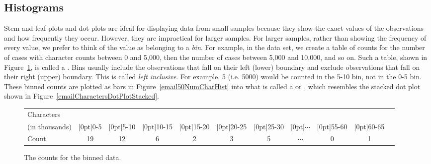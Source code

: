 \subsection{Histograms}
\label{histogramsAndShape}

Stem-and-leaf plots and dot plots are ideal for displaying data from small samples because they show the exact values of the observations and how frequently they occur. However, they are impractical for larger samples. For larger samples, rather than showing the frequency of every value, we prefer to think of the value as belonging to a \emph{bin}. For example, in the  data set, we create a table of counts for the number of cases with character counts between 0 and 5,000, then the number of cases between 5,000 and 10,000, and so on. Such a table, shown in Figure~\ref{binnedNumCharTable}, is called a . Bins usually include the observations that fall on their left (lower) boundary and exclude observations that fall on their right (upper) boundary.  This is called \emph{left inclusive}. For example, 5 (i.e. 5000) would be counted in the 5-10 bin, not in the 0-5 bin.  These binned counts are plotted as bars in Figure~\ref{email50NumCharHist} into what is called a  or , which resembles the stacked dot plot shown in Figure~\ref{emailCharactersDotPlotStacked}.

\begin{figure}[ht]
\centering\small
\begin{tabular}{l ccc ccc ccc c}
  \hline
Characters & \\
(in thousands) & \raisebox{1.5ex}[0pt]{0-5} & \raisebox{1.5ex}[0pt]{5-10} & \raisebox{1.5ex}[0pt]{10-15} & \raisebox{1.5ex}[0pt]{15-20} & \raisebox{1.5ex}[0pt]{20-25} & \raisebox{1.5ex}[0pt]{25-30} & \raisebox{1.5ex}[0pt]{$\cdots$} & \raisebox{1.5ex}[0pt]{55-60} & \raisebox{1.5ex}[0pt]{60-65} \\
  \hline
Count & 19 & 12 & 6 & 2 & 3 & 5 & $\cdots$ & 0 & 1 \\
  \hline
\end{tabular}
\caption{The counts for the binned  data.}
\label{binnedNumCharTable}
\end{figure}

